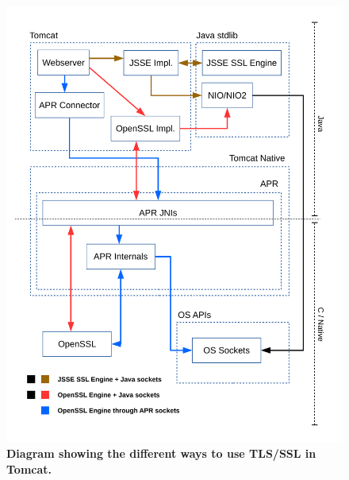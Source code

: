 \documentclass[11pt,a4paper,bibliography=totocnumbered]{scrartcl}
\begin{document}
\begin{figure}[!h]
	\begin{center}
		\includegraphics[scale=0.7]{diagram_current_way.pdf}
	\end{center}
	\caption{\textbf{Diagram showing the different ways to use TLS/SSL in Tomcat.}}
	\label{fig:current}
\end{figure}
\end{document}
